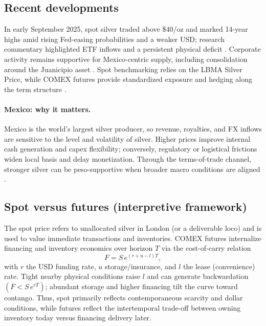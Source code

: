 \documentclass[10pt,a4paper]{article} %
\begin{document}
\subsection{Recent developments}
In early September 2025, spot silver traded above \$40/oz and marked 14-year highs amid rising Fed-easing probabilities and a weaker USD; research commentary highlighted ETF inflows and a persistent physical deficit \citep{reuters_silver_14y_sep1,reuters_tradingday_sep11,reuters_anz_raises_silver,lbma_q2_2025}. Corporate activity remains supportive for Mexico-centric supply, including consolidation around the Juanicipio asset \citep{reuters_paasmag}. Spot benchmarking relies on the LBMA Silver Price, while COMEX futures provide standardized exposure and hedging along the term structure \citep{lbma_prices,cme_silver_overview}.

\paragraph{Mexico: why it matters.}
Mexico is the world’s largest silver producer, so revenue, royalties, and FX inflows are sensitive to the level and volatility of silver. Higher prices improve internal cash generation and capex flexibility; conversely, regulatory or logistical frictions widen local basis and delay monetization. Through the terms-of-trade channel, stronger silver can be peso-supportive when broader macro conditions are aligned \citep{reuters_mx_top_silver}.

\subsection{Spot versus futures (interpretive framework)}
The spot price refers to unallocated silver in London (or a deliverable loco) and is used to value immediate transactions and inventories. COMEX futures internalize financing and inventory economics over horizon \(T\) via the cost-of-carry relation
\[
F=S\,e^{(r+u-l)T},
\]
with \(r\) the USD funding rate, \(u\) storage/insurance, and \(l\) the lease (convenience) rate. Tight nearby physical conditions raise \(l\) and can generate backwardation \((F<S\,e^{rT})\); abundant storage and higher financing tilt the curve toward contango. Thus, spot primarily reflects contemporaneous scarcity and dollar conditions, while futures reflect the intertemporal trade-off between owning inventory today versus financing delivery later.
\end{document}
